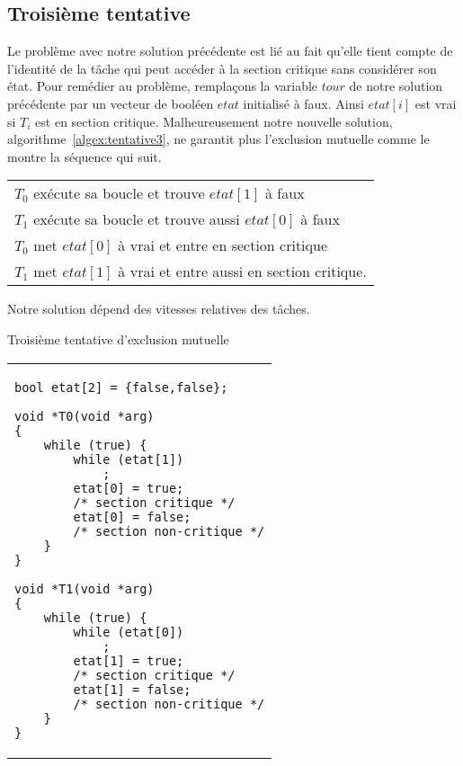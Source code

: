\subsection*{Troisième tentative}
Le problème avec notre solution précédente est lié au fait qu'elle tient compte de l'identité de la tâche qui peut accéder à la section critique sans considérer son état.
Pour remédier au problème, remplaçons la variable $tour$ de notre solution précédente par un vecteur de booléen $etat$ initialisé à faux.
Ainsi $etat[i]$ est vrai si $T_i$ est en section critique.
Malheureusement notre nouvelle solution, algorithme~\ref{algex:tentative3}, ne garantit plus l'exclusion mutuelle comme le montre la séquence qui suit.
\par\noindent
\centering
\begin{tabular}{l}
$T_0$ exécute sa boucle et trouve $etat[1]$ à faux \\
$T_1$ exécute sa boucle et trouve aussi $etat [0]$ à faux \\
$T_0$ met $etat[0]$ à vrai et entre en section critique \\
$T_1$ met $etat[1]$ à vrai et entre aussi en section critique. \\
\end{tabular}

\par\noindent
Notre solution dépend des vitesses relatives des tâches.

\begin{algorithm}[!ht]
\caption{Troisième tentative d'exclusion mutuelle}\label{algex:tentative3}
\centering
\begin{tabular}{l}
\lstset{language=C++}
\begin{lstlisting}
bool etat[2] = {false,false};

void *T0(void *arg)
{
	while (true) {
		while (etat[1])
			;
		etat[0] = true;
		/* section critique */
		etat[0] = false;
		/* section non-critique */
	}
}

void *T1(void *arg)
{
	while (true) {
		while (etat[0])
			;
		etat[1] = true;
		/* section critique */
		etat[1] = false;
		/* section non-critique */
	}
}
\end{lstlisting}
\end{tabular}

\end{algorithm}


